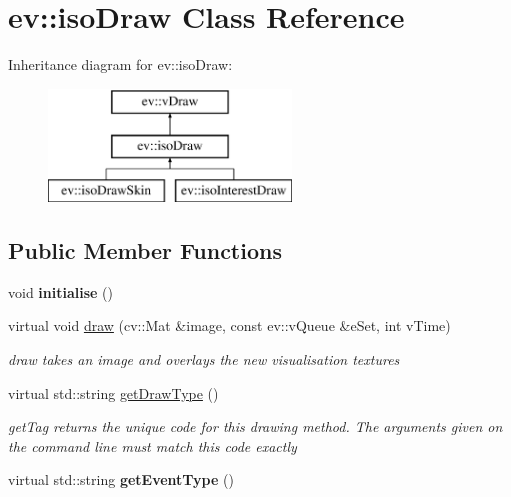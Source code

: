 \hypertarget{classev_1_1isoDraw}{}\section{ev\+:\+:iso\+Draw Class Reference}
\label{classev_1_1isoDraw}
Inheritance diagram for ev\+:\+:iso\+Draw\+:\begin{figure}[H]
\begin{center}
\leavevmode
\includegraphics[height=3.000000cm]{classev_1_1isoDraw}
\end{center}
\end{figure}
\subsection*{Public Member Functions}
\begin{DoxyCompactItemize}
\item 
\mbox{\label{classev_1_1isoDraw_a8a59ea1dc5d3ceba63edc7812b57cc8b}} 
void {\bfseries initialise} ()
\item 
virtual void \hyperlink{classev_1_1isoDraw_ad481b618ae2d08664481ffc4b3c4dd95}{draw} (cv\+::\+Mat \&image, const ev\+::v\+Queue \&e\+Set, int v\+Time)
\begin{DoxyCompactList}\small\item\em draw takes an image and overlays the new visualisation textures \end{DoxyCompactList}\item 
virtual std\+::string \hyperlink{classev_1_1isoDraw_abd32cc393e5489ee97b5a8b94e6dd88d}{get\+Draw\+Type} ()
\begin{DoxyCompactList}\small\item\em get\+Tag returns the unique code for this drawing method. The arguments given on the command line must match this code exactly \end{DoxyCompactList}\item 
\mbox{\label{classev_1_1isoDraw_a65bb091100e7f29b9268d9163af675d9}} 
virtual std\+::string {\bfseries get\+Event\+Type} ()
\end{DoxyCompactItemize}
